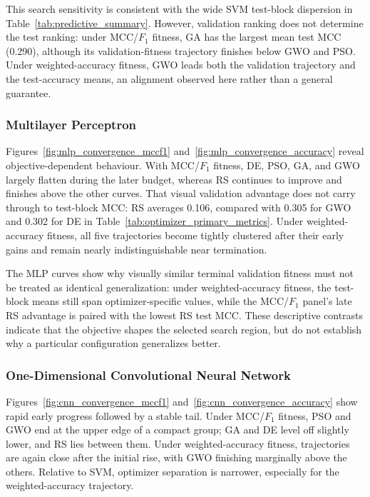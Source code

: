 This search sensitivity is consistent with the wide SVM test-block dispersion in Table~\ref{tab:predictive_summary}. However, validation ranking does not determine the test ranking: under MCC/$F_1$ fitness, GA has the largest mean test MCC (0.290), although its validation-fitness trajectory finishes below GWO and PSO. Under weighted-accuracy fitness, GWO leads both the validation trajectory and the test-accuracy means, an alignment observed here rather than a general guarantee.


\subsubsection{Multilayer Perceptron}

Figures~\ref{fig:mlp_convergence_mccf1} and~\ref{fig:mlp_convergence_accuracy} reveal objective-dependent behaviour. With MCC/$F_1$ fitness, DE, PSO, GA, and GWO largely flatten during the later budget, whereas RS continues to improve and finishes above the other curves. That visual validation advantage does not carry through to test-block MCC: RS averages 0.106, compared with 0.305 for GWO and 0.302 for DE in Table~\ref{tab:optimizer_primary_metrics}. Under weighted-accuracy fitness, all five trajectories become tightly clustered after their early gains and remain nearly indistinguishable near termination.

The MLP curves show why visually similar terminal validation fitness must not be treated as identical generalization: under weighted-accuracy fitness, the test-block means still span optimizer-specific values, while the MCC/$F_1$ panel's late RS advantage is paired with the lowest RS test MCC. These descriptive contrasts indicate that the objective shapes the selected search region, but do not establish why a particular configuration generalizes better.


\subsubsection{One-Dimensional Convolutional Neural Network}

Figures~\ref{fig:cnn_convergence_mccf1} and~\ref{fig:cnn_convergence_accuracy} show rapid early progress followed by a stable tail. Under MCC/$F_1$ fitness, PSO and GWO end at the upper edge of a compact group; GA and DE level off slightly lower, and RS lies between them. Under weighted-accuracy fitness, trajectories are again close after the initial rise, with GWO finishing marginally above the others. Relative to SVM, optimizer separation is narrower, especially for the weighted-accuracy trajectory.

